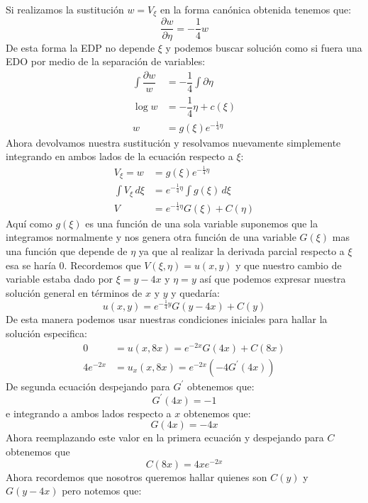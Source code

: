 \begin{homeworkProblem}
\begin{itemize}
\begin{solucion}
           Si realizamos la sustitución $w=V_\xi$ en la forma canónica obtenida tenemos que:
           $$ \dfrac{\partial w}{\partial\eta}=-\dfrac{1}{4}w$$
           De esta forma la EDP no depende $\xi$ y podemos buscar solución como si fuera una EDO por medio de la separación de variables:
           \begin{align*}
               \int\dfrac{\partial w}{w}&=-\dfrac{1}{4}\int\partial\eta\\
               \log w&=-\dfrac{1}{4}\eta+c(\xi)\\
               w&=g(\xi)e^{-\frac{1}{4}\eta}
           \end{align*}
           Ahora devolvamos nuestra sustitución y resolvamos nuevamente simplemente integrando en ambos lados de la ecuación respecto a $\xi$:
           \begin{align*}
               V_\xi=w&=g(\xi)e^{-\frac{1}{4}\eta}\\
               \int V_\xi\,d\xi&=e^{-\frac{1}{4}\eta}\int g(\xi)\,d\xi\\
               V&=e^{-\frac{1}{4}\eta}G(\xi)+C(\eta)
           \end{align*}
           Aquí como $g(\xi)$ es una función de una sola variable suponemos que la integramos normalmente y nos genera otra función de una variable $G(\xi)$ mas una función que depende de $\eta$ ya que al realizar la derivada parcial respecto a $\xi$ esa se haría 0. Recordemos que $V(\xi,\eta)=u(x,y)$ y que nuestro cambio de variable estaba dado por $\xi=y-4x$ y $\eta=y$ así que podemos expresar nuestra solución general en términos de $x$ y $y$ y quedaría:
           $$u(x,y)=e^{-\frac{1}{4}y}G(y-4x)+C(y)$$
           De esta manera podemos usar nuestras condiciones iniciales para hallar la solución especifica:
           \begin{align*}
               0&=u(x,8x)=e^{-2x}G(4x)+C(8x)\\
               4e^{-2x}&=u_x(x,8x)=e^{-2x}(-4G^\prime(4x))
           \end{align*}
           De segunda ecuación despejando para $G^\prime$ obtenemos que:
           $$G^\prime(4x)=-1$$
           e integrando a ambos lados respecto a $x$ obtenemos que:
           $$G(4x)=-4x$$
           Ahora reemplazando este valor en la primera ecuación y despejando para $C$ obtenemos que
           $$C(8x)=4xe^{-2x}$$
           Ahora recordemos que nosotros queremos hallar quienes son $C(y)$ y $G(y-4x)$ pero notemos que:
           \begin{align*}

\end{align*}
\end{solucion}
\end{itemize}
\end{homeworkProblem}
